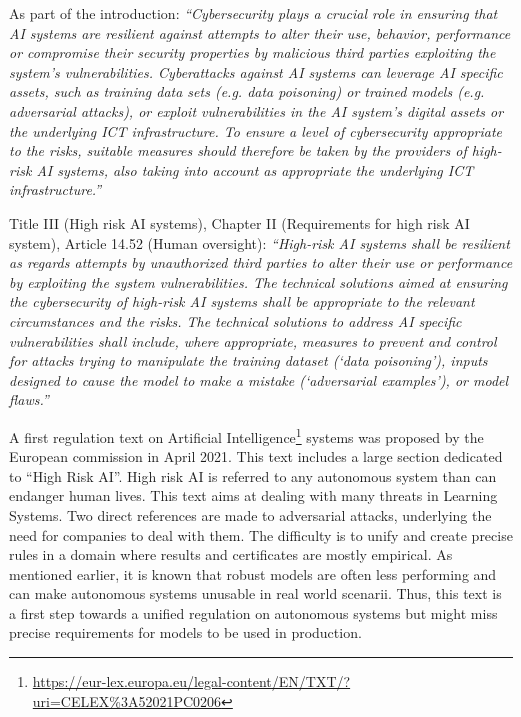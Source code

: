 \begin{tcolorbox}[colback=grund,colframe=rahmen,title=References to adversarial examples in European Commission in law proposal on Artificial Intelligence systems]
\label{ref:adversarial_law}
As part of the introduction: \textit{``Cybersecurity plays a crucial role in ensuring that AI systems are resilient against attempts to alter their use, behavior, performance or compromise their security properties by malicious third parties exploiting the system’s vulnerabilities. Cyberattacks against AI systems can leverage AI specific assets, such as training data sets (e.g. data poisoning) or trained models (e.g. adversarial attacks), or exploit vulnerabilities in the AI system’s digital assets or the underlying ICT infrastructure. To ensure a level of cybersecurity appropriate to the risks, suitable measures should therefore be taken by the providers of high-risk AI systems, also taking into account as appropriate the underlying ICT infrastructure.''}

\medskip
Title III (High risk AI systems), Chapter II (Requirements for high risk AI system), Article 14.52 (Human oversight): \textit{``High-risk AI systems shall be resilient as regards attempts by unauthorized third parties to alter their use or performance by exploiting the system vulnerabilities.
The technical solutions aimed at ensuring the cybersecurity of high-risk AI systems shall be appropriate to the relevant circumstances and the risks.
The technical solutions to address AI specific vulnerabilities shall include, where appropriate, measures to prevent and control for attacks trying to manipulate the training dataset (‘data poisoning’), inputs designed to cause the model to make a mistake (‘adversarial examples’), or model flaws.''}
\end{tcolorbox}
\medskip
A first regulation text on Artificial Intelligence\footnote{\url{https://eur-lex.europa.eu/legal-content/EN/TXT/?uri=CELEX\%3A52021PC0206}} systems was proposed by the European commission in April 2021. This text includes a large section dedicated to ``High Risk AI''. High risk AI is referred to any autonomous system than can endanger human lives.  This text aims at dealing with many threats in Learning Systems. Two direct references are made to adversarial attacks, underlying the need for companies to deal with them. The difficulty is to unify and create precise rules in a domain where results and certificates are mostly empirical. As mentioned earlier, it is known that robust models are often less performing and can make autonomous systems unusable in real world scenarii. Thus, this text is a first step towards a unified regulation on autonomous systems but might miss precise requirements for models to be used in production.


